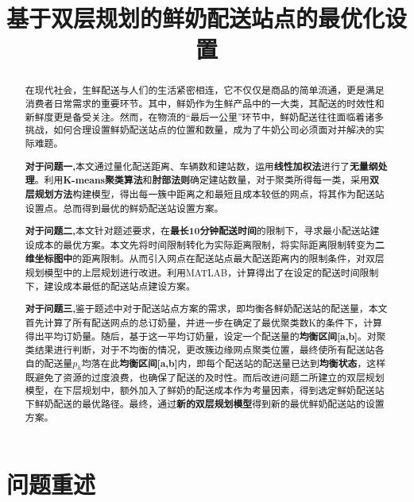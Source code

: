 \documentclass[withoutpreface,bwprint]{cumcmthesis} %
\title{基于双层规划的鲜奶配送站点的最优化设置}
\begin{document}
	
	\maketitle
	\begin{abstract}
		
		在现代社会，生鲜配送与人们的生活紧密相连，它不仅仅是商品的简单流通，更是满足消费者日常需求的重要环节。其中，鲜奶作为生鲜产品中的一大类，其配送的时效性和新鲜度更是备受关注。然而，在物流的“最后一公里”环节中，鲜奶配送往往面临着诸多挑战，如何合理设置鲜奶配送站点的位置和数量，成为了牛奶公司必须面对并解决的实际难题。
		
		\textbf{对于问题一,}本文通过量化配送距离、车辆数和建站数，运用\textbf{线性加权法}进行了\textbf{无量纲处理}。利用\textbf{K-means聚类算法}和\textbf{肘部法则}确定建站数量，对于聚类所得每一类，采用\textbf{双层规划方法}构建模型，得出每一簇中距离之和最短且成本较低的网点，将其作为配送站设置点。总而得到最优的鲜奶配送站设置方案。
		
		\textbf{对于问题二,}本文针对题述要求，在\textbf{最长10分钟配送时间}的限制下，寻求最小配送站建设成本的最优方案。本文先将时间限制转化为实际距离限制，将实际距离限制转变为\textbf{二维坐标图中}的距离限制。从而引入网点在配送站点最大配送距离内的限制条件，对双层规划模型中的上层规划进行改进。利用MATLAB，计算得出了在设定的配送时间限制下，建设成本最低的配送站点建设方案。
		
		
		\textbf{对于问题三,}鉴于题述中对于配送站点方案的需求，即均衡各鲜奶配送站的配送量，本文首先计算了所有配送网点的总订奶量，并进一步在确定了最优聚类数K的条件下，计算得出平均订奶量。随后，基于这一平均订奶量，设定一个配送量的\textbf{均衡区间[a,b]}。对聚类结果进行判断，对于不均衡的情况，更改簇边缘网点聚类位置，最终使所有配送站各自的配送量$p_{h}$均落在此\textbf{均衡区间[a,b]}内，即每个配送站的配送量已达到\textbf{均衡状态}，这样既避免了资源的过度浪费，也确保了配送的及时性。而后改进问题二所建立的双层规划模型，在下层规划中，额外加入了鲜奶的配送成本作为考量因素，得到选定鲜奶配送站下鲜奶配送的最优路径。最终，通过\textbf{新的双层规划模型}得到新的最优鲜奶配送站的设置方案。		
		
		
	\end{abstract}
	
	
	
	\section{问题重述}
\end{document}
